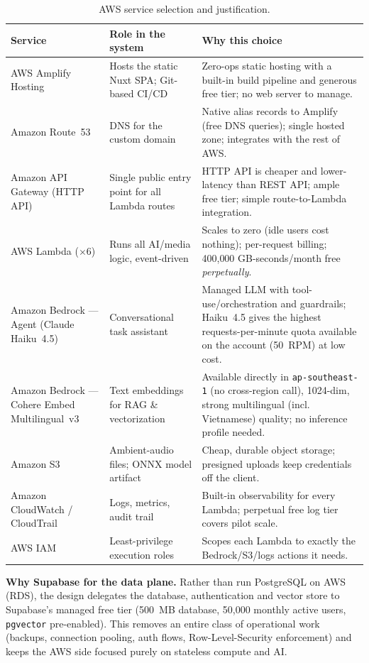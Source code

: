 \documentclass[a4paper,11pt]{article}
\begin{document}
	\begin{table}[H]
		\centering
		\footnotesize
		\begin{tabularx}{\textwidth}{@{}p{3.1cm} p{3.4cm} X@{}}
			\toprule
			\textbf{Service} & \textbf{Role in the system} & \textbf{Why this choice} \\
			\midrule
			AWS Amplify Hosting & Hosts the static Nuxt SPA; Git-based CI/CD & Zero-ops static hosting with a built-in build pipeline and generous free tier; no web server to manage. \\
			Amazon Route~53 & DNS for the custom domain & Native alias records to Amplify (free DNS queries); single hosted zone; integrates with the rest of AWS. \\
			Amazon API Gateway (HTTP API) & Single public entry point for all Lambda routes & HTTP API is cheaper and lower-latency than REST API; ample free tier; simple route-to-Lambda integration. \\
			AWS Lambda ($\times 6$) & Runs all AI/media logic, event-driven & Scales to zero (idle users cost nothing); per-request billing; 400{,}000 GB-seconds/month free \emph{perpetually}. \\
			Amazon Bedrock --- Agent (Claude Haiku~4.5) & Conversational task assistant & Managed LLM with tool-use/orchestration and guardrails; Haiku~4.5 gives the highest requests-per-minute quota available on the account (50~RPM) at low cost. \\
			Amazon Bedrock --- Cohere Embed Multilingual~v3 & Text embeddings for RAG \& vectorization & Available directly in \texttt{ap-southeast-1} (no cross-region call), 1024-dim, strong multilingual (incl. Vietnamese) quality; no inference profile needed. \\
			Amazon S3 & Ambient-audio files; ONNX model artifact & Cheap, durable object storage; presigned uploads keep credentials off the client. \\
			Amazon CloudWatch / CloudTrail & Logs, metrics, audit trail & Built-in observability for every Lambda; perpetual free log tier covers pilot scale. \\
			AWS IAM & Least-privilege execution roles & Scopes each Lambda to exactly the Bedrock/S3/logs actions it needs. \\
			\bottomrule
		\end{tabularx}
		\caption{AWS service selection and justification.}
		\label{tab:services}
	\end{table}

	\noindent\textbf{Why Supabase for the data plane.} Rather than run PostgreSQL on AWS (RDS),
	the design delegates the database, authentication and vector store to Supabase's managed
	free tier (500~MB database, 50{,}000 monthly active users, \texttt{pgvector} pre-enabled).
	This removes an entire class of operational work (backups, connection pooling, auth flows,
	Row-Level-Security enforcement) and keeps the AWS side focused purely on stateless compute
	and AI.
\end{document}
